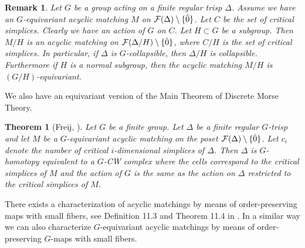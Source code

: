 \documentclass{elsarticle}
\newtheorem{thm}[df]{Theorem}
\newtheorem{rem}[df]{Remark}
\begin{document}
\begin{rem}
\label{quotmatching}
Let $G$ be a group acting on a finite regular trisp $\Delta$. Assume we have an $G$-equivariant acyclic matching $M$ on ${\cal F}(\Delta)\setminus\{\hat{0}\}$. Let $C$ be the set of critical simplices. Clearly we have an action of $G$ on $C$. Let $H\subset G$ be a subgroup. Then $M/H$ is an acyclic matching on ${\cal F}(\Delta/H)\setminus\{\hat{0}\}$, where $C/H$ is the set of critical simplices. In particular, if $\Delta$ is $G$-collapsible, then $\Delta/H$ is collapsible. Furthermore if $H$ is a normal subgroup, then the acyclic matching $M/H$ is $(G/H)$-equivariant.
\end{rem}
We also have an equivariant version of the Main Theorem of Discrete Morse Theory.
\begin{thm}[Freij, \cite{freij}]
\label{freij}
Let $G$ be a finite group. Let $\Delta$ be a finite regular $G$-trisp and let $M$ be a $G$-equivariant acyclic matching on the poset ${\cal F}(\Delta)\setminus\{\hat{0}\}$. Let $c_i$ denote the number of critical $i$-dimensional simplices of $\Delta$. Then $\Delta$ is $G$-homotopy equivalent to a $G$-CW complex where the cells correspond to the critical simplices of $M$ and the action of $G$ is the same as the action on $\Delta$ restricted to the critical simplices of $M$.
\end{thm}
There exists a characterization of acyclic matchings by means of order-preserving maps with small fibers, see Definition 11.3 and Theorem 11.4 in \cite[Chapter 11]{buch}. In a similar way we can also characterize $G$-equivariant acyclic matchings by means of order-preserving $G$-maps with small fibers.
\end{document}

